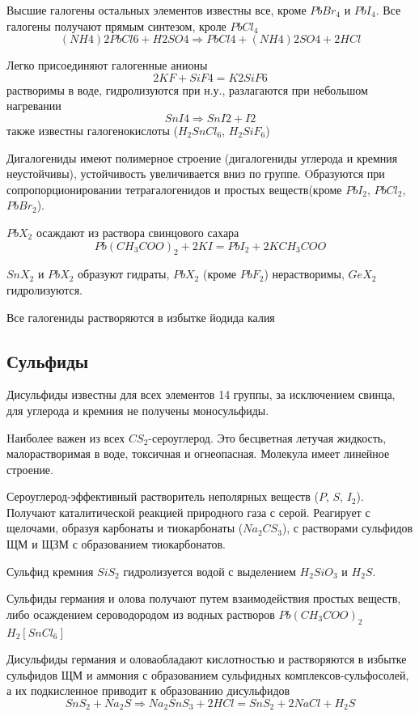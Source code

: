 \documentclass[11pt]{article}
\begin{document}
Высшие галогены остальных элементов известны все, кроме $PbBr_4$ и $PbI_4$. Все
галогены получают прямым синтезом, кроле $PbCl_4$ 
$$(NH4)2PbCl6+H2SO4\Rightarrow PbCl4 + (NH4)2SO4+2HCl$$

Легко присоединяют галогенные анионы $$2KF+SiF4=K2SiF6$$
растворимы в воде, гидролизуются при н.у., разлагаются при небольшом нагревании
$$SnI4\Rightarrow SnI2+I2$$
 также известны галогенокислоты ($H_2SnCl_6$, $H_2SiF_6$)

Дигалогениды имеют полимерное строение (дигалогениды углерода и кремния
неустойчивы), устойчивость увеличивается вниз по группе. Oбразуются при
сопропорционировании тетрагалогенидов и простых веществ(кроме $PbI_2$, $PbCl_2$, $PbBr_2$).

$PbX_2$ осаждают из раствора свинцового сахара $$Pb(CH_3COO)_2+2KI=PbI_2+2KCH_3COO$$

$SnX_2$ и $PbX_2$ образуют гидраты, $PbX_2$ (кроме $PbF_2$) нерастворимы, $GeX_2$ гидролизуются.

Все галогениды растворяются в избытке йодида калия

\subsection{Сульфиды}

Дисульфиды известны для всех элементов 14 группы, за исключением  свинца, для
углерода  и кремния не получены моносульфиды.

Hаиболее важен из всех $CS_2$-сероуглерод. Это бесцветная летучая жидкость,
малорастворимая в воде, токсичная и огнеопасная. Молекула имеет линейное строение.

Сероуглерод-эффективный растворитель неполярных веществ ($P$, $S$, $I_2$). Получают
каталитической реакцией природного газа с серой. Реагирует с щелочами, образуя
карбонаты и тиокарбонаты ($Na_2CS_3$), с растворами сульфидов ЩМ и ЩЗМ с образованием
тиокарбонатов.

Сульфид кремния $SiS_2$ гидролизуется водой с выделением $H_2SiO_3$ и $H_2S$.

Сульфиды германия и олова получают путем взаимодействия простых веществ, либо
осаждением сероводородом из водных растворов $Pb(CH_3COO)_2$ $H_2[SnCl_6]$

Дисульфиды германия и оловаобладают кислотностью и растворяются в избытке
сульфидов ЩМ и аммония с образованием сульфидных комплексов-сульфосолей, а их
подкисленное приводит к образованию дисульфидов
$$SnS_2+Na_2S\Rightarrow Na_2SnS_3+2HCl=SnS_2+2NaCl+H_2S$$
\end{document}
